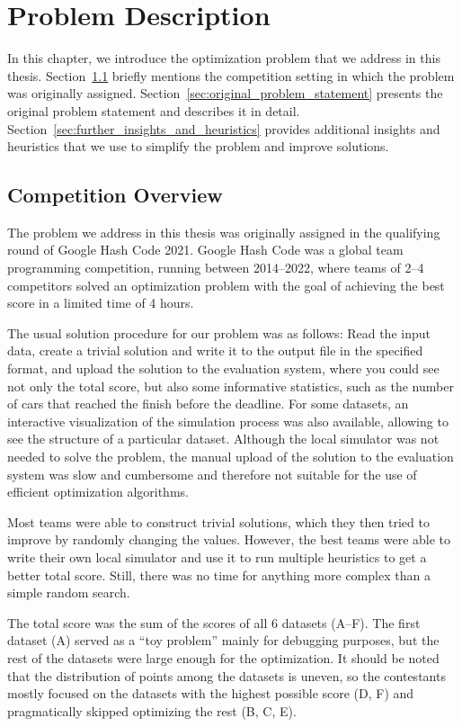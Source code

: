 \chapter{Problem Description} \label{chap:problem_description}


In this chapter, we introduce the optimization problem that we address in this thesis. Section~\ref{sec:competition_overview} briefly mentions the competition setting in which the problem was originally assigned. Section~\ref{sec:original_problem_statement} presents the original problem statement and describes it in detail. Section~\ref{sec:further_insights_and_heuristics} provides additional insights and heuristics that we use to simplify the problem and improve solutions.

\section{Competition Overview} \label{sec:competition_overview}

The problem we address in this thesis was originally assigned in the qualifying round of Google Hash Code 2021. Google Hash Code was a global team programming competition, running between 2014--2022, where teams of 2--4 competitors solved an optimization problem with the goal of achieving the best score in a limited time of 4 hours.

The usual solution procedure for our problem was as follows: Read the input data, create a trivial solution and write it to the output file in the specified format, and upload the solution to the evaluation system, where you could see not only the total score, but also some informative statistics, such as the number of cars that reached the finish before the deadline. For some datasets, an interactive visualization of the simulation process was also available, allowing to see the structure of a particular dataset. Although the local simulator was not needed to solve the problem, the manual upload of the solution to the evaluation system was slow and cumbersome and therefore not suitable for the use of efficient optimization algorithms.

Most teams were able to construct trivial solutions, which they then tried to improve by randomly changing the values. However, the best teams were able to write their own local simulator and use it to run multiple heuristics to get a better total score. Still, there was no time for anything more complex than a simple random search.

The total score was the sum of the scores of all 6 datasets (A--F). The first dataset (A) served as a ``toy problem'' mainly for debugging purposes, but the rest of the datasets were large enough for the optimization. It should be noted that the distribution of points among the datasets is uneven, so the contestants mostly focused on the datasets with the highest possible score (D, F) and pragmatically skipped optimizing the rest (B, C, E).

